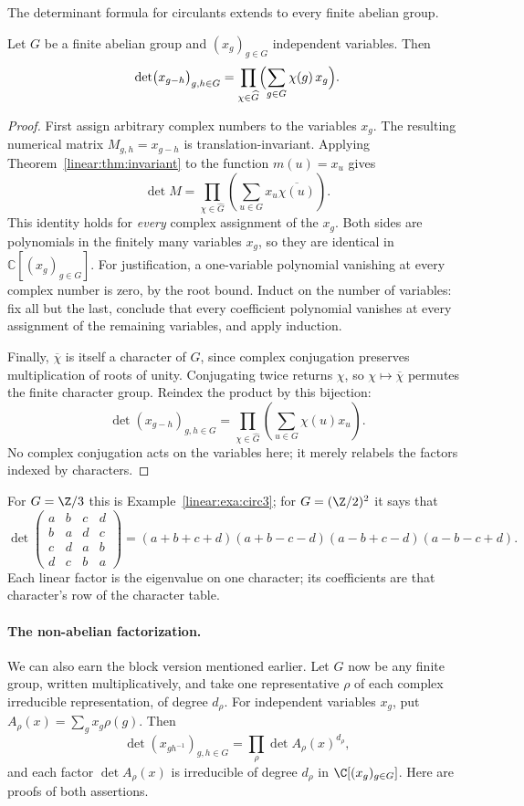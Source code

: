 The determinant formula for circulants extends to every finite abelian group.

\begin{theorem}[Dedekind]\label{linear:thm:groupdet}
Let $G$ be a finite abelian group and $(x_g)_{g\in G}$ independent variables. Then
\[
\det\bigl(x_{g-h}\bigr)_{g,h\in G}=\prod_{\chi\in\widehat G}\Bigl(\sum_{g\in G}\chi(g)\,x_g\Bigr).
\]
\end{theorem}
\begin{proof}
First assign arbitrary complex numbers to the
variables $x_g$. The resulting numerical
matrix $M_{g,h}=x_{g-h}$ is
translation-invariant. Applying
Theorem~\ref{linear:thm:invariant}
to the function $m(u)=x_u$ gives
\[
\det M=
\prod_{\chi\in\widehat G}
\left(\sum_{u\in G}x_u\overline{\chi(u)}\right).
\]
This identity holds for \emph{every}
complex assignment of the $x_g$.
Both sides are polynomials in the
finitely many variables $x_g$,
so they are identical in
$\mathbb C[(x_g)_{g\in G}]$.
For justification, a one-variable polynomial vanishing at every complex
number is zero, by the root bound. Induct on the number of variables:
fix all but the last, conclude that every coefficient polynomial vanishes
at every assignment of the remaining variables, and apply induction.

Finally, $\overline\chi$ is itself
a character of $G$, since complex
conjugation preserves multiplication
of roots of unity. Conjugating twice
returns $\chi$, so
$\chi\mapsto\overline\chi$ permutes
the finite character group.
Reindex the product by this bijection:
\[
\det(x_{g-h})_{g,h\in G}
=\prod_{\chi\in\widehat G}
\left(\sum_{u\in G}\chi(u)x_u\right).
\]
No complex conjugation acts on the
variables here; it merely relabels
the factors indexed by characters.
\end{proof}

For $G=\Z/3$ this is Example~\ref{linear:exa:circ3}; for $G=(\Z/2)^2$ it says that
\[
\det\begin{pmatrix}a&b&c&d\\b&a&d&c\\c&d&a&b\\d&c&b&a\end{pmatrix}=(a+b+c+d)(a+b-c-d)(a-b+c-d)(a-b-c+d).
\]
Each linear factor is the eigenvalue on one character; its coefficients are
that character's row of the character table.

\paragraph{The non-abelian factorization.}
We can also earn the block version mentioned earlier. Let $G$ now be any
finite group, written multiplicatively, and take one representative $\rho$
of each complex irreducible representation, of degree $d_\rho$.
For independent variables $x_g$, put $A_\rho(x)=\sum_g x_g\rho(g)$. Then
\[
\det(x_{gh^{-1}})_{g,h\in G}
=\prod_\rho\det A_\rho(x)^{d_\rho},
\]
and each factor $\det A_\rho(x)$ is irreducible of degree $d_\rho$ in
$\C[(x_g)_{g\in G}]$. Here are proofs of both assertions.

